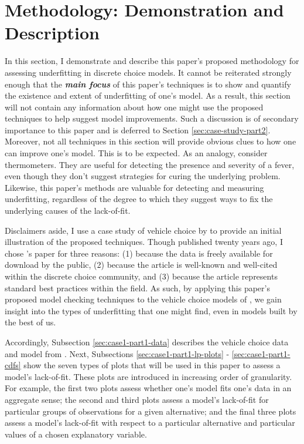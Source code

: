 \documentclass[preprint]{elsarticle}
\begin{document}
\section{Methodology: Demonstration and Description}
\label{sec:methods}
In this section, I demonstrate and describe this paper's proposed methodology for assessing underfitting in discrete choice models. It cannot be reiterated strongly enough that the \textbf{\textit{main focus}} of this paper's techniques is to show and quantify the existence and extent of underfitting of one's model. As a result, this section will not contain any information about how one might use the proposed techniques to help suggest model improvements. Such a discussion is of secondary importance to this paper and is deferred to Section \ref{sec:case-study-part2}. Moreover, not all techniques in this section will provide obvious clues to how one can improve one's model. This is to be expected. As an analogy, consider thermometers. They are useful for detecting the presence and severity of a fever, even though they don't suggest strategies for curing the underlying problem. Likewise, this paper's methods are valuable for detecting and measuring underfitting, regardless of the degree to which they suggest ways to fix the underlying causes of the lack-of-fit.

Disclaimers aside, I use a case study of vehicle choice by \citet{brownstone_forecasting_1998} to provide an initial illustration of the proposed techniques. Though published twenty years ago, I chose \citeauthor{brownstone_forecasting_1998}'s paper for three reasons: (1) because the data is freely available for download by the public, (2) because the article is well-known and well-cited within the discrete choice community, and (3) because the article represents standard best practices within the field. As such, by applying this paper's proposed model checking techniques to the vehicle choice models of \citet{brownstone_forecasting_1998}, we gain insight into the types of underfitting that one might find, even in models built by the best of us.

Accordingly, Subsection \ref{sec:case1-part1-data} describes the vehicle choice data and model from \citet{brownstone_forecasting_1998}. Next, Subsections \ref{sec:case1-part1-lp-plots} - \ref{sec:case1-part1-cdfs} show the seven types of plots that will be used in this paper to assess a model's lack-of-fit. These plots are introduced in increasing order of granularity. For example, the first two plots assess whether one's model fits one's data in an aggregate sense; the second and third plots assess a model's lack-of-fit for particular groups of observations for a given alternative; and the final three plots assess a model's lack-of-fit with respect to a particular alternative and particular values of a chosen explanatory variable.
\end{document}
